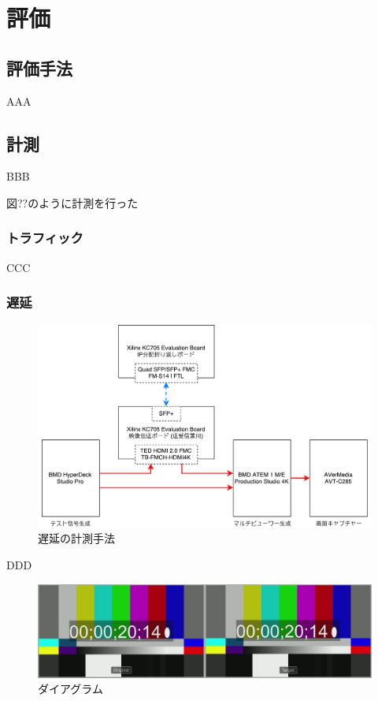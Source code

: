 \chapter{評価}
\label{chap:evaluation}

\section{評価手法}



AAA

\section{計測}

BBB

図??のように計測を行った

\subsection{トラフィック}

CCC

\subsection{遅延}

\begin{figure}[htbp]
  \begin{center}
    \includegraphics[bb=0 0 697 422,width=15.5cm]{img/evaluate-diagram.pdf}
  \end{center}
  \caption{遅延の計測手法}
  \label{fig:evaluate-diagram}
\end{figure}

DDD

\begin{figure}[htbp]
  \begin{center}
    \includegraphics[bb=0 0 1920 540,width=14cm]{img/evaluate-delay.png}
  \end{center}
  \caption{ダイアグラム}
  \label{fig:evaluate-delay}
\end{figure}

